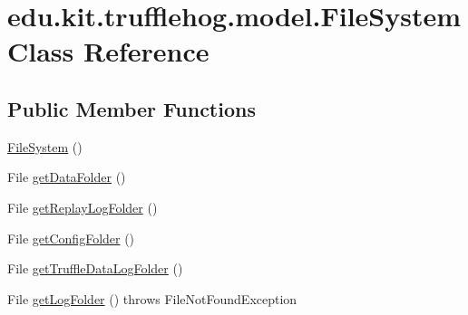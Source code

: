 \hypertarget{classedu_1_1kit_1_1trufflehog_1_1model_1_1_file_system}{}\section{edu.\+kit.\+trufflehog.\+model.\+File\+System Class Reference}
\label{classedu_1_1kit_1_1trufflehog_1_1model_1_1_file_system}
\subsection*{Public Member Functions}
\begin{DoxyCompactItemize}
\item 
\hyperlink{classedu_1_1kit_1_1trufflehog_1_1model_1_1_file_system_adbc995de33c1ac9171e424abaa8d69d8}{File\+System} ()
\item 
File \hyperlink{classedu_1_1kit_1_1trufflehog_1_1model_1_1_file_system_af99824871df77f3caa54231bfc6d1195}{get\+Data\+Folder} ()
\item 
File \hyperlink{classedu_1_1kit_1_1trufflehog_1_1model_1_1_file_system_a86b9894762fd3cdb5a2b14effb2de333}{get\+Replay\+Log\+Folder} ()
\item 
File \hyperlink{classedu_1_1kit_1_1trufflehog_1_1model_1_1_file_system_a79727e770c2813a6e1e9653f79d83094}{get\+Config\+Folder} ()
\item 
File \hyperlink{classedu_1_1kit_1_1trufflehog_1_1model_1_1_file_system_acb34555797963d707e3ba87d7cdc340b}{get\+Truffle\+Data\+Log\+Folder} ()
\item 
File \hyperlink{classedu_1_1kit_1_1trufflehog_1_1model_1_1_file_system_a423b2e19eb7dc0c6cb499604b1f44f12}{get\+Log\+Folder} ()  throws File\+Not\+Found\+Exception 
\end{DoxyCompactItemize}


